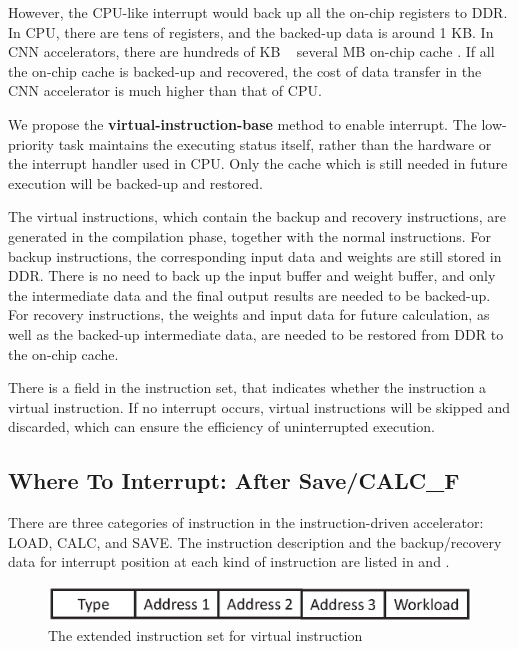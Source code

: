 However, the CPU-like interrupt would back up all the on-chip registers to DDR. In CPU, there are tens of registers, and the backed-up data is around 1 KB. In CNN accelerators, there are hundreds of KB ~ several MB on-chip cache \cite{qiu2016going, yu2018instruction}. If all the on-chip cache is backed-up and recovered, the cost of data transfer in the CNN accelerator is much higher than that of CPU.

We propose the \textbf{virtual-instruction-base} method to enable interrupt. The low-priority task maintains the executing status itself, rather than the hardware or the interrupt handler used in CPU. Only the cache which is still needed in future execution will be backed-up and restored.

The virtual instructions, which contain the backup and recovery instructions, are generated in the compilation phase, together with the normal instructions. 
For backup instructions, the corresponding input data and weights are still stored in DDR. 
There is no need to back up the input buffer and weight buffer, and only the intermediate data and the final output results are needed to be backed-up. 
For recovery instructions, the weights and input data for future calculation, as well as the backed-up intermediate data, are needed to be restored from DDR to the on-chip cache.

There is a field in the instruction set, that indicates whether the instruction a virtual instruction. If no interrupt occurs, virtual instructions will be skipped and discarded, which can ensure the efficiency of uninterrupted execution.

\subsection{ Where To Interrupt: After Save/CALC\_F }
\label{sec:whereinter}

There are three categories of instruction in the instruction-driven accelerator: LOAD, CALC, and SAVE. The instruction description and the backup/recovery data for interrupt position at each kind of instruction are listed in  and .

\begin{figure}[h]
	\centering
	\includegraphics[width=0.9\linewidth]{fig/normal_instr.eps}
	\caption{The extended instruction set for virtual instruction }
	\label{fig:normal_instr}
\end{figure}



